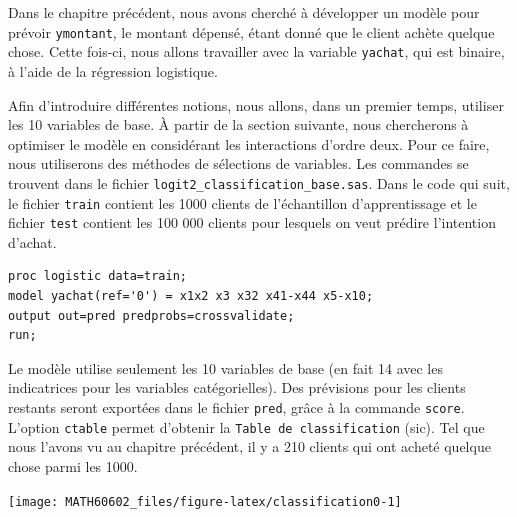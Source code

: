 \documentclass[
  11pt,
  letterpaper,
]{book}
\theoremstyle{definition}
\theoremstyle{definition}
\theoremstyle{definition}
\theoremstyle{remark}
\begin{document}
Dans le chapitre précédent, nous avons cherché à développer un modèle pour prévoir \texttt{ymontant}, le montant dépensé, étant donné que le client achète quelque chose. Cette fois-ci, nous allons travailler avec la variable \texttt{yachat}, qui est binaire, à l'aide de la régression logistique.

Afin d'introduire différentes notions, nous allons, dans un premier temps, utiliser les 10 variables de base. À partir de la section suivante, nous chercherons à optimiser le modèle en considérant les interactions d'ordre deux. Pour ce faire, nous utiliserons des méthodes de sélections de variables. Les commandes se trouvent dans le fichier \texttt{logit2\_classification\_base.sas}. Dans le code qui suit, le fichier \texttt{train} contient les 1000 clients de l'échantillon d'apprentissage et le fichier \texttt{test} contient les 100 000 clients pour lesquels on veut prédire l'intention d'achat.

\begin{verbatim}
proc logistic data=train;
model yachat(ref='0') = x1x2 x3 x32 x41-x44 x5-x10;
output out=pred predprobs=crossvalidate;
run;
\end{verbatim}

Le modèle utilise seulement les 10 variables de base (en fait 14 avec les indicatrices pour les variables catégorielles). Des prévisions pour les clients restants seront exportées dans le fichier \texttt{pred}, grâce à la commande \texttt{score}. L'option \texttt{ctable} permet d'obtenir la \texttt{Table\ de\ classification} (sic). Tel que nous l'avons vu au chapitre précédent, il y a 210 clients qui ont acheté quelque chose parmi les 1000.

\begin{center}\texttt{[image: MATH60602\_files/figure-latex/classification0-1]} \end{center}
\end{document}
